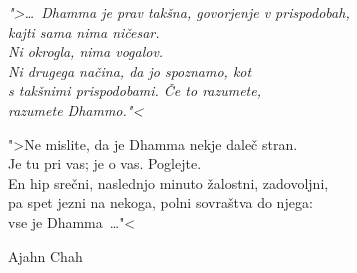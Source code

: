 \documentclass[11pt,twoside,final]{memoir}
\begin{document}

\begin{quotepage}{0.7\linewidth}
\itshape
">… Dhamma je prav takšna, govorjenje v prispodobah,\\
kajti sama nima ničesar.\\
Ni okrogla, nima vogalov.\\
Ni drugega načina, da jo spoznamo, kot\\
s takšnimi prispodobami. Če to razumete,\\
razumete Dhammo."<

">Ne mislite, da je Dhamma nekje daleč stran.\\
Je tu pri vas; je o vas. Poglejte.\\
En hip srečni, naslednjo minuto žalostni, zadovoljni,\\
pa spet jezni na nekoga, polni sovraštva do njega:\\
vse je Dhamma …"<

{\upshape Ajahn Chah}
\end{quotepage}


\mainmatter*


\setcounter{chapter}{0}





\backmatter




\cleartorecto
\thispagestyle{plain}


\emptysheet
\end{document}
